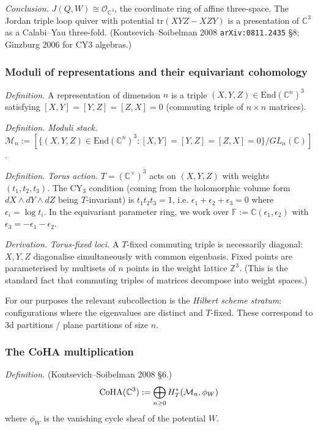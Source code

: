 \emph{Conclusion.} $J(Q, W) \cong \mathcal{O}_{\mathbb{C}^3}$, the coordinate ring of
affine three-space. The Jordan triple loop quiver with potential $\mathrm{tr}(XYZ - XZY)$
is a presentation of $\mathbb{C}^3$ as a Calabi--Yau three-fold. (Kontsevich--Soibelman
2008 \texttt{arXiv:0811.2435} §8; Ginzburg 2006 for CY3 algebras.)

\subsubsection{Moduli of representations and their equivariant cohomology}

\emph{Definition.} A representation of dimension $n$ is a triple
$(X, Y, Z) \in \mathrm{End}(\mathbb{C}^n)^3$ satisfying $[X, Y] = [Y, Z] = [Z, X] = 0$
(commuting triple of $n \times n$ matrices).

\emph{Definition.} \emph{Moduli stack.}
$\mathcal{M}_n := [\{(X, Y, Z) \in \mathrm{End}(\mathbb{C}^n)^3 : [X,Y]=[Y,Z]=[Z,X]=0\}/GL_n(\mathbb{C})]$.

\emph{Definition.} \emph{Torus action.}
$T = (\mathbb{C}^\times)^3$ acts on $(X, Y, Z)$ with weights $(t_1, t_2, t_3)$.
The CY$_3$ condition (coming from the holomorphic volume form $dX \wedge dY \wedge dZ$
being $T$-invariant) is $t_1 t_2 t_3 = 1$, i.e.
$\epsilon_1 + \epsilon_2 + \epsilon_3 = 0$ where $\epsilon_i = \log t_i$.
In the equivariant parameter ring, we work over
$\mathbb{F} := \mathbb{C}(\epsilon_1, \epsilon_2)$ with $\epsilon_3 = -\epsilon_1 - \epsilon_2$.

\emph{Derivation.} \emph{Torus-fixed loci.}
A $T$-fixed commuting triple is necessarily diagonal: $X, Y, Z$ diagonalise
simultaneously with common eigenbasis. Fixed points are parameterised by
multisets of $n$ points in the weight lattice $\mathbb{Z}^3$. (This is the
standard fact that commuting triples of matrices decompose into weight spaces.)

For our purposes the relevant subcollection is the \emph{Hilbert scheme
stratum}: configurations where the eigenvalues are distinct and $T$-fixed.
These correspond to 3d partitions / plane partitions of size $n$.

\subsubsection{The CoHA multiplication}

\emph{Definition.} (Kontsevich--Soibelman 2008 §6.)
\[
\mathrm{CoHA}(\mathbb{C}^3) := \bigoplus_{n \geq 0} H^*_T(\mathcal{M}_n, \phi_{W})
\]
where $\phi_W$ is the vanishing cycle sheaf of the potential $W$.

